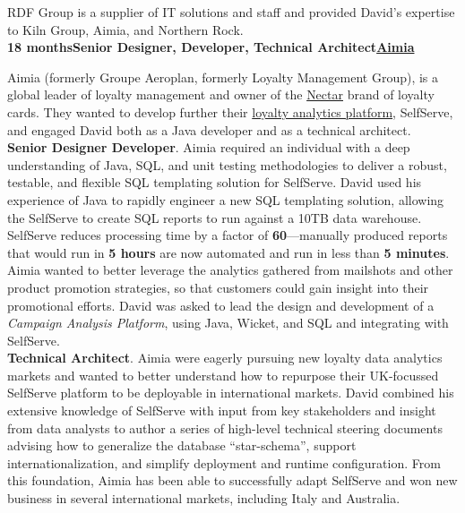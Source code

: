 \documentclass[a4paper,12pt]{article}
\newcommand{\clientwork}[3]{\textbf{#1\hfill#3\hfill#2}\nopagebreak}
\begin{document}
RDF Group is a supplier of IT solutions and staff and provided David's expertise to Kiln Group, Aimia, and Northern Rock.\\

\clientwork{18 months}{\href{http://www.aimia.com/}{Aimia}}{Senior Designer, Developer, Technical Architect}

Aimia (formerly Groupe Aeroplan, formerly Loyalty Management Group), is a global leader of loyalty management and owner of the \href{http://www.nectar.com/}{Nectar} brand of loyalty cards. They wanted to develop further their \href{http://www.aimia.com/English/Services/Loyalty-Analytics/default.aspx}{loyalty analytics platform}, SelfServe, and engaged David both as a Java developer and as a technical architect.\\

\textbf{Senior Designer Developer}. Aimia required an individual with a deep understanding of Java, SQL, and unit testing methodologies to deliver a robust, testable, and flexible SQL templating solution for SelfServe. David used his experience of Java to rapidly engineer a new SQL templating solution, allowing the SelfServe to create SQL reports to run against a 10TB data warehouse. SelfServe reduces processing time by a factor of \textbf{60}---manually produced reports that would run in \textbf{5 hours} are now automated and run in less than \textbf{5 minutes}.\\

Aimia wanted to better leverage the analytics gathered from mailshots and other product promotion strategies, so that customers could gain insight into their promotional efforts. David was asked to lead the design and development of a \emph{Campaign Analysis Platform}, using Java, Wicket, and SQL and integrating with SelfServe.\\

\textbf{Technical Architect}. Aimia were eagerly pursuing new loyalty data analytics markets and wanted to better understand how to repurpose their UK-focussed SelfServe platform to be deployable in international markets. David combined his extensive knowledge of SelfServe with input from key stakeholders and insight from data analysts to author a series of high-level technical steering documents advising how to generalize the database ``star-schema'', support internationalization, and simplify deployment and runtime configuration. From this foundation, Aimia has been able to successfully adapt SelfServe and won new business in several international markets, including Italy and Australia.\\
\end{document}
